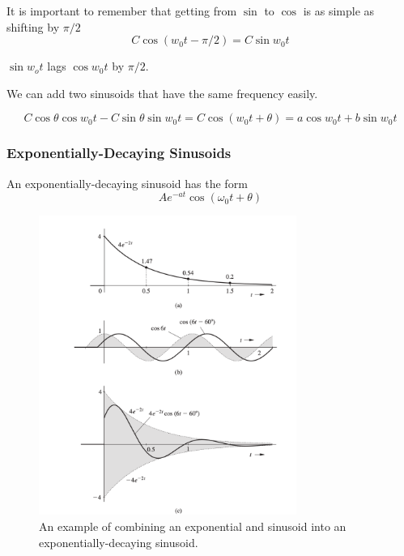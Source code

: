 It is important to remember that getting from $\sin$ to $\cos$ is as simple as shifting by $\pi/2$
\begin{equation}
    C \cos(w_0 t - \pi/2) = C \sin w_0 t
\end{equation}

$\sin w_o t$ lags $\cos w_0 t$ by $\pi/2$.

We can add two sinusoids that have the same frequency easily.

\begin{equation}
    C \cos \theta \cos w_0 t - C \sin \theta \sin w_0 t = C \cos (w_0 t + \theta) = a \cos w_0 t + b \sin w_0 t 
\end{equation}

\subsubsection{Exponentially-Decaying Sinusoids}
An exponentially-decaying sinusoid has the form 
\begin{equation}
    Ae^{-at} \cos (\omega_0 t + \theta)
\end{equation}
\begin{figure}[htbp]
  \centerline{\includegraphics[width=0.75\textwidth]{../../images/drawing_exponential_sinusoids.png}}
  \caption{An example of combining an exponential and sinusoid into an exponentially-decaying sinusoid.}
  \label{fig:drawing_exponential_sinusoids}
\end{figure}

